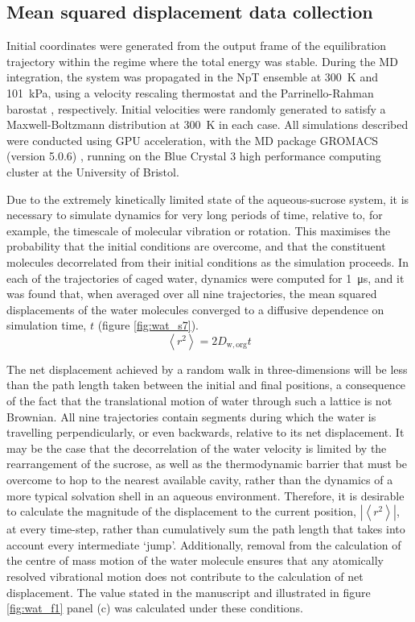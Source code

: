 \subsection{Mean squared displacement data collection}
Initial coordinates were generated from the output frame of the equilibration trajectory within the regime where the total energy was stable. During the MD integration, the system was propagated in the NpT ensemble at \SI{300}{\kelvin} and \SI{101}{\kilo\pascal}, using a velocity rescaling thermostat \cite{bussiCanonicalSamplingVelocity2007} and the Parrinello-Rahman barostat \cite{parrinelloPolymorphicTransitionsSingle1981}, respectively. Initial velocities were randomly generated to satisfy a Maxwell-Boltzmann distribution at \SI{300}{\kelvin} in each case. All simulations described were conducted using GPU acceleration, with the MD package GROMACS (version 5.0.6) \cite{abrahamGROMACSHighPerformance2015}, running on the Blue Crystal 3 high performance computing cluster at the University of Bristol.

Due to the extremely kinetically limited state of the aqueous-sucrose system, it is necessary to simulate dynamics for very long periods of time, relative to, for example, the timescale of molecular vibration or rotation. This maximises the probability that the initial conditions are overcome, and that the constituent molecules decorrelated from their initial conditions as the simulation proceeds. In each of the trajectories of caged water, dynamics were computed for \SI{1}{\micro\second}, and it was found that, when averaged over all nine trajectories, the mean squared displacements of the water molecules converged to a diffusive dependence on simulation time, $t$ (figure \ref{fig:wat_s7}).
\begin{equation}\label{eqn:wat_msd}
\left\langle r^{2}\right\rangle=2 D_{\mathrm{w, org}} t
\end{equation}

The net displacement achieved by a random walk in three-dimensions will be less than the path length taken between the initial and final positions, a consequence of the fact that the translational motion of water through such a lattice is not Brownian. All nine trajectories contain segments during which the water is travelling perpendicularly, or even backwards, relative to its net displacement. It may be the case that the decorrelation of the water velocity is limited by the rearrangement of the sucrose, as well as the thermodynamic barrier that must be overcome to hop to the nearest available cavity, rather than the dynamics of a more typical solvation shell in an aqueous environment. Therefore, it is desirable to calculate the magnitude of the displacement to the current position, $\left|\left\langle r^{2}\right\rangle\right|$, at every time-step, rather than cumulatively sum the path length that takes into account every intermediate `jump’. Additionally, removal from the calculation of the centre of mass motion of the water molecule ensures that any atomically resolved vibrational motion does not contribute to the calculation of net displacement. The value stated in the manuscript and illustrated in figure \ref{fig:wat_f1} panel (c) was calculated under these conditions. 

